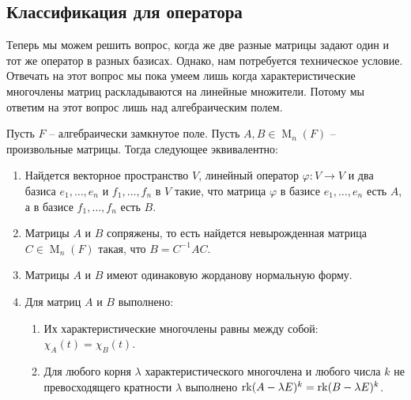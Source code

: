 \subsection{Классификация для оператора}

Теперь мы можем решить вопрос, когда же две разные матрицы задают один и тот же оператор в разных базисах.
Однако, нам потребуется техническое условие.
Отвечать на этот вопрос мы пока умеем лишь когда характеристические многочлены матриц раскладываются на линейные множители.
Потому мы ответим на этот вопрос лишь над алгебраическим полем.

\begin{claim}
Пусть $F$ -- алгебраически замкнутое поле.
Пусть $A, B \in \operatorname{M}_n(F)$ -- произвольные матрицы.
Тогда следующее эквивалентно:
\begin{enumerate}
\item Найдется векторное пространство $V$, линейный оператор $\varphi\colon V\to V$ и два базиса $e_1,\ldots,e_n$ и $f_1,\ldots,f_n$ в $V$ такие, что матрица $\varphi$ в базисе $e_1,\ldots,e_n$ есть $A$, а в базисе $f_1,\ldots,f_n$ есть $B$.

\item Матрицы $A$ и $B$ сопряжены, то есть найдется невырожденная матрица $C\in \operatorname{M}_n(F)$ такая, что $B = C^{-1} A C$.

\item Матрицы $A$ и $B$ имеют одинаковую жорданову нормальную форму.

\item Для матриц $A$ и $B$ выполнено:
\begin{enumerate}
\item Их характеристические многочлены равны между собой: $\chi_A(t) = \chi_B(t)$.

\item Для любого корня $\lambda$ характеристического многочлена и любого числа $k$ не превосходящего кратности $\lambda$ выполнено $\operatorname{rk} (A - \lambda E)^k = \operatorname{rk} (B - \lambda E)^k$.
\end{enumerate}
\end{enumerate}
\end{claim}
